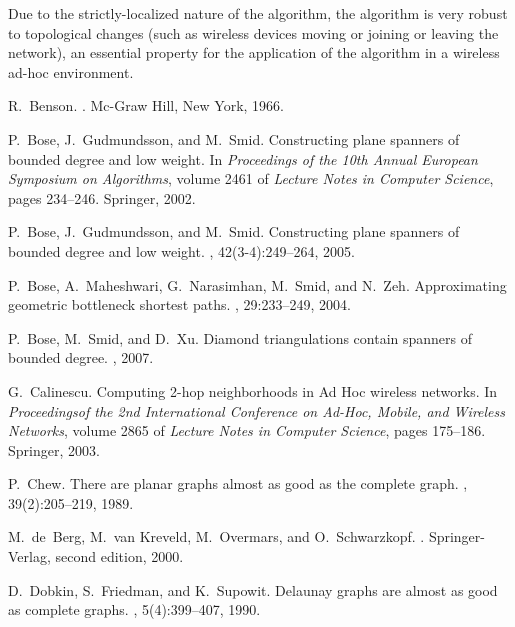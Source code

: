 \documentclass{stacs_proc}
\theoremstyle{plain}\newtheorem{satz}[thm]{Satz}
\begin{document}
Due to the strictly-localized nature of the algorithm, the algorithm
is very robust to topological changes (such as wireless devices moving or
joining or leaving the network), an essential property for
the application of the algorithm in a wireless ad-hoc environment.

\begin{thebibliography}{10}

R.~Benson.
.
\newblock Mc-Graw Hill, New York, 1966.

P.~Bose, J.~Gudmundsson, and M.~Smid.
\newblock Constructing plane spanners of bounded degree and low weight.
\newblock In {\em Proceedings of the 10th Annual European Symposium on
  Algorithms}, volume 2461 of {\em Lecture Notes in Computer Science}, pages
  234--246. Springer, 2002.

P.~Bose, J.~Gudmundsson, and M.~Smid.
\newblock Constructing plane spanners of bounded degree and low weight.
, 42(3-4):249--264, 2005.

P.~Bose, A.~Maheshwari, G.~Narasimhan, M.~Smid, and N.~Zeh.
\newblock Approximating geometric bottleneck shortest paths.
, 29:233--249,
  2004.

P.~Bose, M.~Smid, and D.~Xu.
\newblock Diamond triangulations contain spanners of bounded degree.
, 2007.

G.~Calinescu.
\newblock Computing 2-hop neighborhoods in {Ad Hoc} wireless networks.
\newblock In {\em Proceedingsof the 2nd International Conference on Ad-Hoc,
  Mobile, and Wireless Networks}, volume 2865 of {\em Lecture Notes in Computer
  Science}, pages 175--186. Springer, 2003.

P.~Chew.
\newblock There are planar graphs almost as good as the complete graph.
, 39(2):205--219,
  1989.

M.~de~Berg, M.~van Kreveld, M.~Overmars, and O.~Schwarzkopf.
.
\newblock Springer-Verlag, second edition, 2000.

D.~Dobkin, S.~Friedman, and K.~Supowit.
\newblock Delaunay graphs are almost as good as complete graphs.
, 5(4):399--407, 1990.


\end{thebibliography}
\end{document}
